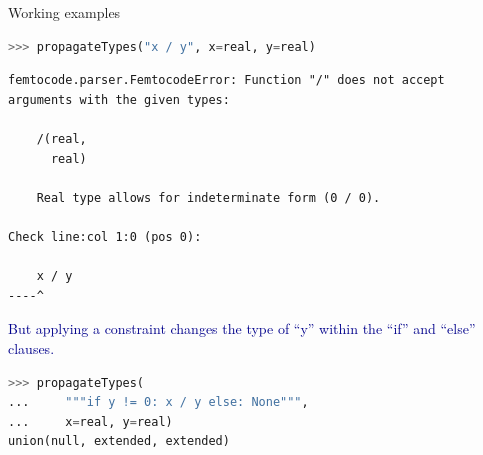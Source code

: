 \documentclass{beamer}
\begin{document}
\begin{frame}[fragile]{Working examples}
\vspace{0.2 cm}
\begin{lstlisting}[language=python]
>>> propagateTypes("x / y", x=real, y=real)
\end{lstlisting}
\color{red}
\begin{lstlisting}[basicstyle=\ttfamily\scriptsize]
femtocode.parser.FemtocodeError: Function "/" does not accept arguments with the given types:

    /(real,
      real)

    Real type allows for indeterminate form (0 / 0).

Check line:col 1:0 (pos 0):

    x / y
----^
\end{lstlisting}

\textcolor{darkblue}{But applying a constraint changes the type of ``y'' within the ``if'' and ``else'' clauses.}
\color{black}
\begin{lstlisting}[language=python]
>>> propagateTypes(
...     """if y != 0: x / y else: None""",
...     x=real, y=real)
union(null, extended, extended)
\end{lstlisting}
\end{frame}
\end{document}

